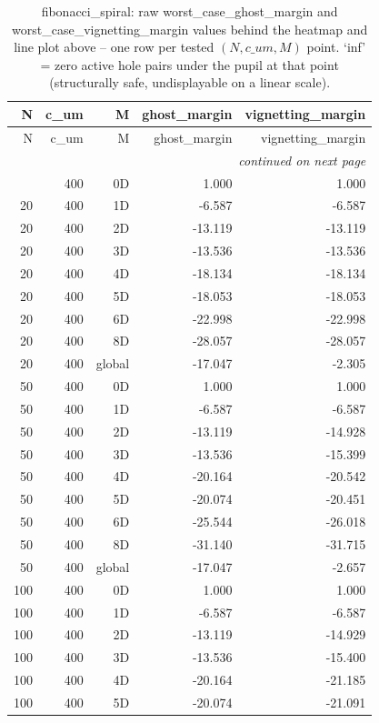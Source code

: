 \begin{longtable}{rrrrr}
\caption{fibonacci\_spiral: raw worst\_case\_ghost\_margin and worst\_case\_vignetting\_margin values behind the heatmap and line plot above -- one row per tested $(N, c\_um, M)$ point. `inf' = zero active hole pairs under the pupil at that point (structurally safe, undisplayable on a linear scale).} \\
\toprule
N & c\_um & M & ghost\_margin & vignetting\_margin \\
\midrule
\endfirsthead
\toprule
N & c\_um & M & ghost\_margin & vignetting\_margin \\
\midrule
\endhead
\midrule
\multicolumn{5}{r}{\itshape continued on next page} \\
\endfoot
\bottomrule
\endlastfoot
20 & 400 & 0D & 1.000 & 1.000 \\
20 & 400 & 1D & -6.587 & -6.587 \\
20 & 400 & 2D & -13.119 & -13.119 \\
20 & 400 & 3D & -13.536 & -13.536 \\
20 & 400 & 4D & -18.134 & -18.134 \\
20 & 400 & 5D & -18.053 & -18.053 \\
20 & 400 & 6D & -22.998 & -22.998 \\
20 & 400 & 8D & -28.057 & -28.057 \\
20 & 400 & global & -17.047 & -2.305 \\
50 & 400 & 0D & 1.000 & 1.000 \\
50 & 400 & 1D & -6.587 & -6.587 \\
50 & 400 & 2D & -13.119 & -14.928 \\
50 & 400 & 3D & -13.536 & -15.399 \\
50 & 400 & 4D & -20.164 & -20.542 \\
50 & 400 & 5D & -20.074 & -20.451 \\
50 & 400 & 6D & -25.544 & -26.018 \\
50 & 400 & 8D & -31.140 & -31.715 \\
50 & 400 & global & -17.047 & -2.657 \\
100 & 400 & 0D & 1.000 & 1.000 \\
100 & 400 & 1D & -6.587 & -6.587 \\
100 & 400 & 2D & -13.119 & -14.929 \\
100 & 400 & 3D & -13.536 & -15.400 \\
100 & 400 & 4D & -20.164 & -21.185 \\
100 & 400 & 5D & -20.074 & -21.091 \\

\end{longtable}
